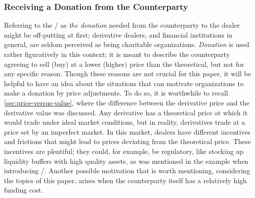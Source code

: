 \documentclass[main.tex]{subfiles}
\begin{document}
        \subsubsection*{Receiving a Donation from the Counterparty}

        Referring to the \FVA/ as \textit{the donation} needed from the counterparty to the dealer
        might be off-putting at first;
        derivative dealers, and financial institutions in general, 
        are seldom perceived as being charitable organizations.
        \textit{Donation} is used rather figuratively in this context;
        it is meant to describe the counterparty agreeing 
        to sell (buy) at a lower (higher) price than the theoretical,
        but not for any specific reason.
        Though these reasons are not crucial for this paper,
        it will be helpful to have an idea about the situations that can motivate organizations
        to make a donation by price adjustments.
        To do so, it is worthwhile to recall \cref{sec:price-versus-value},
        where the difference between the derivative price and the derivative value was discussed.
        Any derivative has a theoretical price 
        at which it would trade under ideal market conditions,
        but in reality, derivatives trade at a price set by an imperfect market.
        In this market, dealers have different incentives and frictions
        that might lead to prices deviating from the theoretical price.
        These incentives are plentiful; they could, for example, be regulatory, 
        like stocking up liquidity buffers with high quality assets,
        as was mentioned in the example when introducing \FVA/.
        Another possible motivation that is worth mentioning, considering the topics of this paper,
        arises when the counterparty itself has a relatively high funding cost.
\end{document}
